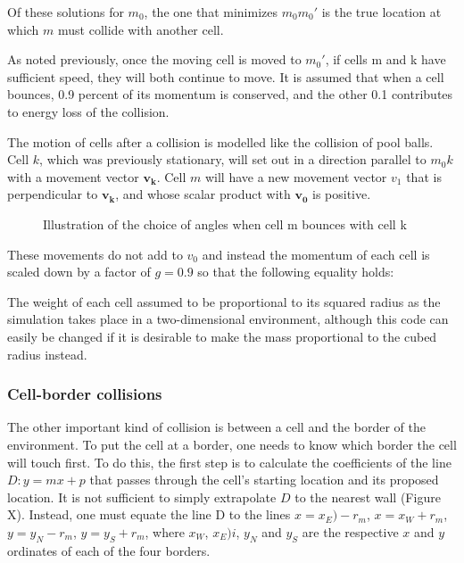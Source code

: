 \documentclass[11.5pt]{article}
\begin{document}
\begin{figure}[H]
\centering
\end{figure}

Of these solutions for \(m_0\), the one that minimizes \(m_0m_0'\) 
is the true location at which \(m\) must collide with another 
cell. 

As noted previously, once the moving cell is moved to \(m_0'\), if 
cells m and k have sufficient speed, they will both continue to move. It 
is assumed that when a cell bounces, 0.9 percent of its momentum is 
conserved, and the other 0.1 contributes to energy loss of the 
collision. 

The motion of cells after a collision is modelled like the collision of 
pool balls. Cell \(k\), which was previously stationary, will 
set out in a direction parallel to \(m_0k\) with a movement vector \(\mathbf{v
_k}\). Cell \(m\) will have a new movement vector \(v_1\) 
that is perpendicular to \(\mathbf{v_k}\), and whose scalar product with \(\mathbf{v_0}\) 
is positive.

\begin{figure}[H]
\centering
\caption{Illustration of the choice of angles when 
cell m bounces with cell k}
\end{figure}

These movements do not add to \(v_0\) and instead the momentum of 
each cell is scaled down by a factor of \(g = 0.9\) so that the following 
equality holds:

\begin{figure}[H]
\centering
\end{figure}

The weight of each cell assumed to be proportional to its squared radius 
as the simulation takes place in a two-dimensional environment, although 
this code can easily be changed if it is desirable to make the mass 
proportional to the cubed radius instead.

\subsubsection{Cell-border collisions}
The other important kind of collision is between a cell and the border 
of the environment. To put the cell at a border, one needs to know which 
border the cell will touch first. To do this, the first step is to 
calculate the coefficients of the line \(D: y=mx + p\) that passes through 
the cell's starting location and its proposed location. It is not 
sufficient to simply extrapolate \(D\) to the nearest wall (Figure X). 
Instead, one must equate the line D to the lines 
\(x = x_E) - r_m\), \(x = x_W + r_m\), \(y = y_N - r_m\), \(y = y_S + r_m\), 
where \(x_W\), \(x_E)i\), \(y_N\) and \(y_S\) are the respective \(x\) 
and \(y\) ordinates of each of the four borders.
\end{document}

